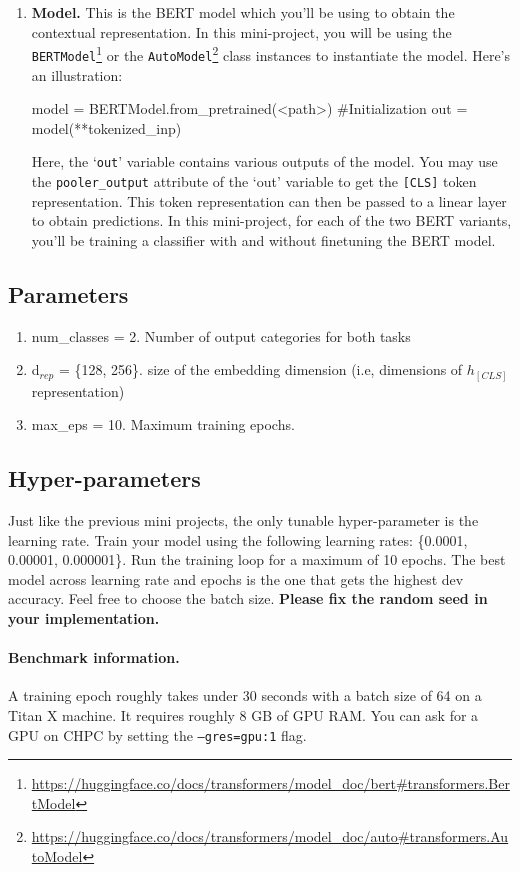 \begin{enumerate}
    \item \textbf{Model.} This is the BERT model which you'll be using to obtain the contextual representation.  In this mini-project, you will be using the \texttt{BERTModel}\footnote{\url{https://huggingface.co/docs/transformers/model_doc/bert#transformers.BertModel}} or the \texttt{AutoModel}\footnote{\url{https://huggingface.co/docs/transformers/model_doc/auto#transformers.AutoModel}} class instances to instantiate the model. Here's an illustration:
    \begin{python}
    model = BERTModel.from_pretrained(<path>)   #Initialization
    out = model(**tokenized_inp)
    \end{python}
    Here, the `\texttt{out}' variable contains various outputs of the model. You may use the \texttt{pooler\_output} attribute of the `out' variable to get the \texttt{[CLS]} token representation. This token representation can then be passed to a linear layer to obtain predictions. In this mini-project, for each of the two BERT variants, you'll be training a classifier with and without finetuning the BERT model.
\end{enumerate}



\subsection{Parameters}
\begin{enumerate} 
     \item num\_classes = 2. Number of output categories for both tasks
     \item d$_{rep}$ = \{128, 256\}. size of the embedding dimension (i.e, dimensions of $h_{[CLS]}$ representation)
     \item max\_eps = 10. Maximum training epochs.
\end{enumerate}

\subsection{Hyper-parameters}
Just like the previous mini projects, the only tunable hyper-parameter is the learning rate. Train your model using the following learning rates: \{0.0001, 0.00001, 0.000001\}. Run the training loop for a maximum of 10 epochs. The best model across learning rate and epochs is the one that gets the highest dev accuracy. Feel free to choose the batch size. \textbf{Please fix the random seed in your implementation.}

\paragraph{Benchmark information. } A training epoch roughly takes under 30 seconds with a batch size of 64 on a Titan X machine. It requires roughly 8 GB of GPU RAM. You can ask for a GPU on CHPC by setting the \texttt{--gres=gpu:1} flag. 